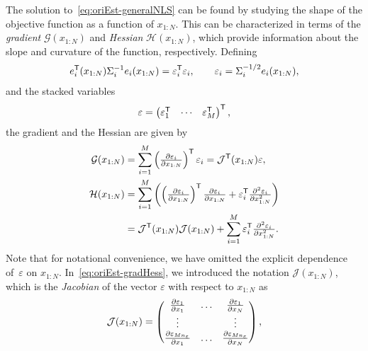 \documentclass{article}
\begin{document}
The solution to~\eqref{eq:oriEst-generalNLS} can be found by studying the shape of the objective function as a function of $x_{1:N}$. This can be characterized in terms of the \textit{gradient} $\mathcal{G}(x_{1:N})$ and \textit{Hessian} $\mathcal{H}(x_{1:N})$, which provide information about the slope and curvature of the function, respectively. Defining 
\begin{align*}
e^{\mathsf{T}}_i(x_{1:N}) \Sigma_i^{-1} e_i(x_{1:N}) = \varepsilon_i^{\mathsf{T}} \varepsilon_i, \qquad \varepsilon_i = \Sigma_i^{-1/2} e_i(x_{1:N}),
\end{align*}
and the stacked variables 
\begin{align*}
\varepsilon = \begin{pmatrix} \varepsilon_1^{\mathsf{T}} & \cdots & \varepsilon^{\mathsf{T}}_M \end{pmatrix}^{\mathsf{T}},
\end{align*}
the gradient and the Hessian are given by
\begin{subequations}
\label{eq:oriEst-gradHess}
\begin{align}
\mathcal{G}(x_{1:N}) &= \sum_{i = 1}^{M} \left( \tfrac{\partial \varepsilon_i}{\partial x_{1:N}} \right)^{\mathsf{T}} \varepsilon_i= \mathcal{J}^{\mathsf{T}}(x_{1:N}) \varepsilon, \label{eq:oriEst-gradient} \\
\mathcal{H}(x_{1:N}) &= \sum_{i = 1}^{M} \left( \left( \tfrac{\partial \varepsilon_i}{\partial x_{1:N}} \right)^{\mathsf{T}} \tfrac{\partial \varepsilon_i}{\partial x_{1:N}} + \varepsilon_i^{\mathsf{T}} \tfrac{\partial^2 \varepsilon_i}{\partial x_{1:N}^2} \right) \nonumber \\
&= \mathcal{J}^{\mathsf{T}}(x_{1:N}) \mathcal{J}(x_{1:N}) + \sum_{i = 1}^{M} \varepsilon_i^{\mathsf{T}} \tfrac{\partial^2 \varepsilon_i}{\partial x_{1:N}^2}. \label{eq:oriEst-hessian}
\end{align}
\end{subequations}
Note that for notational convenience, we have omitted the explicit dependence of~$\varepsilon$ on $x_{1:N}$. In~\eqref{eq:oriEst-gradHess}, we introduced the notation $\mathcal{J}(x_{1:N})$, which is the \emph{Jacobian} of the vector $\varepsilon$ with respect to $x_{1:N}$ as
\begin{align}
\mathcal{J}(x_{1:N}) = \begin{pmatrix} \tfrac{\partial \varepsilon_1}{\partial x_1} & \hdots & \tfrac{\partial \varepsilon_1}{\partial x_N} \\
\vdots & & \vdots \\
\tfrac{\partial \varepsilon_{M n_\varepsilon}}{\partial x_1} & \hdots & \tfrac{\partial \varepsilon_{ M n_\varepsilon}}{\partial x_N}
\end{pmatrix},
\end{align}
\end{document}
